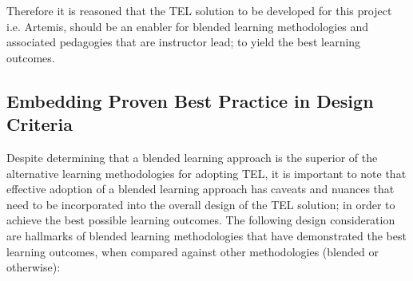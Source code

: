 Therefore it is reasoned that the TEL solution to be developed for this project i.e. Artemis, should be an enabler for blended learning methodologies and associated pedagogies that are instructor lead; to yield the best learning outcomes.

\label{sec:sec01}
\subsection{Embedding Proven Best Practice in Design Criteria}
\label{embeddingBestPracticePedagogy}

Despite determining that a blended learning approach is the superior of the alternative learning methodologies for adopting TEL, it is important to note that effective adoption of a blended learning approach has caveats and nuances that need to be incorporated into the overall design of the TEL solution; in order to achieve the best possible learning outcomes. The following design consideration are hallmarks of blended learning methodologies that have demonstrated the best learning outcomes, when compared against other methodologies (blended or otherwise)\cite{Means2009,Team2008,RickReis}:


